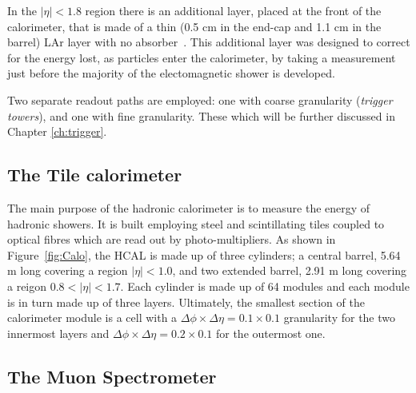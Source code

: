  				In the $\left | \eta\right | < 1.8$ region there is an additional layer, placed at the front of the calorimeter, that is made of a thin (0.5 cm in the end-cap and 1.1 cm in the barrel) LAr layer with no absorber~\cite{ATLASLAR}. This additional layer was designed to correct for the energy lost, as particles enter the calorimeter, by taking a measurement just before the majority of the electomagnetic shower is developed. 

 				Two separate readout paths are employed: one with coarse granularity (\emph{trigger towers}), and one with fine granularity. These which will be further discussed in Chapter \ref{ch:trigger}.


			\subsection*{The Tile calorimeter}

				The main purpose of the hadronic calorimeter is to measure the energy of hadronic showers. It is built employing steel and scintillating tiles coupled to optical fibres which are read out by photo-multipliers. As shown in Figure~\ref{fig:Calo}, the HCAL is made up of three cylinders; a central barrel, 5.64 m long covering a region $\left | \eta \right | < 1.0$, and two extended barrel, 2.91 m long covering a reigon $0.8 < \left | \eta \right | < 1.7$. Each cylinder is made up of 64 modules and each module is in turn made up of three layers. Ultimately, the smallest section of the calorimeter module is a cell with a $\Delta \phi \times \Delta \eta = 0.1 \times 0.1$ granularity for the two innermost layers and $\Delta \phi \times \Delta \eta = 0.2 \times 0.1$ for the outermost one. 

		\subsection{The Muon Spectrometer}
		\label{sec:MuSpec}

